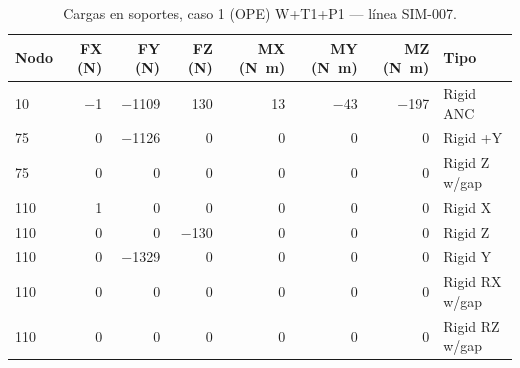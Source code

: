 \begin{table}[htbp]
  \centering
  \footnotesize
  \caption{Cargas en soportes, caso 1 (OPE) W+T1+P1 — línea SIM-007.}
  \label{tab:restricciones-ope}
  \begin{tabular}{lrrrrrrl}
    \toprule
    Nodo & FX (\si{N}) & FY (\si{N}) & FZ (\si{N}) & MX (\si{N.m}) & MY (\si{N.m}) & MZ (\si{N.m}) & Tipo \\
    \midrule
    10 & \num{-1} & \num{-1109} & \num{130} & \num{13} & \num{-43} & \num{-197} & Rigid ANC \\
    75 & \num{0} & \num{-1126} & \num{0} & \num{0} & \num{0} & \num{0} & Rigid +Y \\
    75 & \num{0} & \num{0} & \num{0} & \num{0} & \num{0} & \num{0} & Rigid Z w/gap \\
    110 & \num{1} & \num{0} & \num{0} & \num{0} & \num{0} & \num{0} & Rigid X \\
    110 & \num{0} & \num{0} & \num{-130} & \num{0} & \num{0} & \num{0} & Rigid Z \\
    110 & \num{0} & \num{-1329} & \num{0} & \num{0} & \num{0} & \num{0} & Rigid Y \\
    110 & \num{0} & \num{0} & \num{0} & \num{0} & \num{0} & \num{0} & Rigid RX w/gap \\
    110 & \num{0} & \num{0} & \num{0} & \num{0} & \num{0} & \num{0} & Rigid RZ w/gap \\
    \bottomrule
  \end{tabular}
\end{table}
